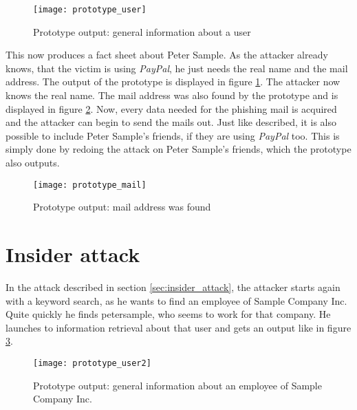 \begin{figure}[htb]
  \begin{center}
    \texttt{[image: prototype\_user]}
    \caption{Prototype output: general information about a user}
    \label{fig:prototype_user}
  \end{center}
\end{figure}

This now produces a fact sheet about Peter Sample. As the attacker already
knows, that the victim is using \textit{PayPal}, he just needs the real name
and the mail address. The output of the prototype is displayed in figure
\ref{fig:prototype_user}. The attacker now knows the real name. The mail
address was also found by the prototype and is displayed in figure
\ref{fig:prototype_mail}. Now, every data needed for the phishing mail is
acquired and the attacker can begin to send the mails out. Just like described,
it is also possible to include Peter Sample's friends, if they are using
\textit{PayPal} too. This is simply done by redoing the attack on Peter
Sample's friends, which the prototype also outputs.

\begin{figure}[htb]
  \begin{center}
    \texttt{[image: prototype\_mail]}
    \caption{Prototype output: mail address was found}
    \label{fig:prototype_mail}
  \end{center}
\end{figure}

\section{Insider attack}

In the attack described in section \ref{sec:insider_attack},
the attacker starts again with a keyword search, as he wants to find an
employee of Sample Company Inc. Quite quickly he finds petersample, who seems to work
for that company. He launches to information retrieval about that user and gets
an output like in figure \ref{fig:prototype_user2}.

\begin{figure}[htb]
  \begin{center}
    \texttt{[image: prototype\_user2]}
    \caption{Prototype output: general information about an employee of Sample
    Company Inc.}
    \label{fig:prototype_user2}
  \end{center}
\end{figure}

